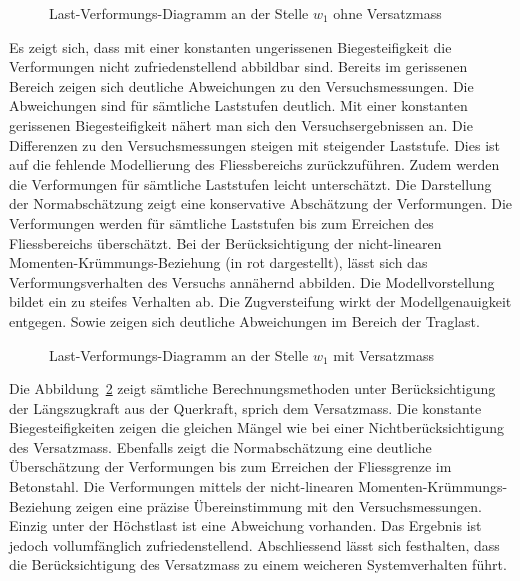 \documentclass[
  12pt,
  letterpaper,
  egregdoesnotlikesansseriftitles]{scrreprt}
\begin{document}
\begin{figure}[H]


\caption{\label{fig-last_verformung_vergleich}Last-Verformungs-Diagramm
an der Stelle \(w_1\) ohne Versatzmass}

\end{figure}%

Es zeigt sich, dass mit einer konstanten ungerissenen Biegesteifigkeit
die Verformungen nicht zufriedenstellend abbildbar sind. Bereits im
gerissenen Bereich zeigen sich deutliche Abweichungen zu den
Versuchsmessungen. Die Abweichungen sind für sämtliche Laststufen
deutlich. Mit einer konstanten gerissenen Biegesteifigkeit nähert man
sich den Versuchsergebnissen an. Die Differenzen zu den
Versuchsmessungen steigen mit steigender Laststufe. Dies ist auf die
fehlende Modellierung des Fliessbereichs zurückzuführen. Zudem werden
die Verformungen für sämtliche Laststufen leicht unterschätzt. Die
Darstellung der Normabschätzung zeigt eine konservative Abschätzung der
Verformungen. Die Verformungen werden für sämtliche Laststufen bis zum
Erreichen des Fliessbereichs überschätzt. Bei der Berücksichtigung der
nicht-linearen Momenten-Krümmungs-Beziehung (in rot dargestellt), lässt
sich das Verformungsverhalten des Versuchs annähernd abbilden. Die
Modellvorstellung bildet ein zu steifes Verhalten ab. Die Zugversteifung
wirkt der Modellgenauigkeit entgegen. Sowie zeigen sich deutliche
Abweichungen im Bereich der Traglast.

\begin{figure}[H]


\caption{\label{fig-last_verformung_laengszug}Last-Verformungs-Diagramm
an der Stelle \(w_1\) mit Versatzmass}

\end{figure}%

Die Abbildung~\ref{fig-last_verformung_laengszug} zeigt sämtliche
Berechnungsmethoden unter Berücksichtigung der Längszugkraft aus der
Querkraft, sprich dem Versatzmass. Die konstante Biegesteifigkeiten
zeigen die gleichen Mängel wie bei einer Nichtberücksichtigung des
Versatzmass. Ebenfalls zeigt die Normabschätzung eine deutliche
Überschätzung der Verformungen bis zum Erreichen der Fliessgrenze im
Betonstahl. Die Verformungen mittels der nicht-linearen
Momenten-Krümmungs-Beziehung zeigen eine präzise Übereinstimmung mit den
Versuchsmessungen. Einzig unter der Höchstlast ist eine Abweichung
vorhanden. Das Ergebnis ist jedoch vollumfänglich zufriedenstellend.
Abschliessend lässt sich festhalten, dass die Berücksichtigung des
Versatzmass zu einem weicheren Systemverhalten führt.
\end{document}
